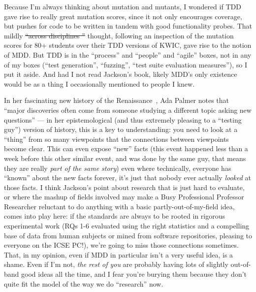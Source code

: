 \documentclass[sigplan,screen]{acmart}
\providecommand{\DIFadd}[1]{{\protect\color{blue}\uwave{#1}}} %
\providecommand{\DIFdel}[1]{{\protect\color{red}\sout{#1}}}                      %
\providecommand{\DIFaddbegin}{} %
\providecommand{\DIFaddend}{} %
\providecommand{\DIFdelbegin}{} %
\providecommand{\DIFdelend}{} %
\newcommand{\DIFscaledelfig}{0.5}
\newlength{\DIFdelgraphicswidth} %
\newlength{\DIFdelgraphicsheight} %
\newcommand{\DIFaddincludegraphics}[2][]{{\color{blue}\fbox{\DIFOincludegraphics[#1]{#2}}}} %
\newcommand{\DIFdelincludegraphics}[2][]{%
\sbox{\DIFdelgraphicsbox}{\DIFOincludegraphics[#1]{#2}}%
\settoboxwidth{\DIFdelgraphicswidth}{\DIFdelgraphicsbox} %
\settoboxtotalheight{\DIFdelgraphicsheight}{\DIFdelgraphicsbox} %
\scalebox{\DIFscaledelfig}{%
\parbox[b]{\DIFdelgraphicswidth}{\usebox{\DIFdelgraphicsbox}\\[-\baselineskip] \rule{\DIFdelgraphicswidth}{0em}}\llap{\resizebox{\DIFdelgraphicswidth}{\DIFdelgraphicsheight}{%
\setlength{\unitlength}{\DIFdelgraphicswidth}%
\begin{picture}(1,1)%
\thicklines\linethickness{2pt} %
{\color[rgb]{1,0,0}\put(0,0){\framebox(1,1){}}}%
{\color[rgb]{1,0,0}\put(0,0){\line( 1,1){1}}}%
{\color[rgb]{1,0,0}\put(0,1){\line(1,-1){1}}}%
\end{picture}%
}\hspace*{3pt}}} %
} %
\DeclareRobustCommand{\DIFaddbegin}{\DIFOaddbegin \let\includegraphics\DIFaddincludegraphics} %
\DeclareRobustCommand{\DIFaddend}{\DIFOaddend \let\includegraphics\DIFOincludegraphics} %
\DeclareRobustCommand{\DIFdelbegin}{\DIFOdelbegin \let\includegraphics\DIFdelincludegraphics} %
\DeclareRobustCommand{\DIFdelend}{\DIFOaddend \let\includegraphics\DIFOincludegraphics} %
\begin{document}
Because I'm always thinking about mutation and mutants, I wondered if
TDD gave rise to really great mutation scores, since it not only
encourages coverage, but pushes for code to be written in tandem with
good functionality probes.  That mildly \DIFdelbegin \DIFdel{``across disciplines
''
}\DIFdelend \DIFaddbegin \DIFadd{across disciplines
}\DIFaddend thought, following an inspection of the mutation scores for 80+
students over their TDD versions of KWIC,
gave rise to the notion of MDD.  But TDD is in the ``process'' and
``people'' and ``agile'' boxes, not in any of my boxes (``test
generation'', ``fuzzing'', ``test suite evaluation measures''), so I
put it aside.  And had I not read Jackson's book, likely MDD's only
existence would be as a thing I occasionally mentioned to people I knew.

In her fascinating new history of the Renaissance~\cite{palmer}, Ada
Palmer notes that ``major discoveries often come from someone studying
a different topic asking new questions'' --- in her epistemological
(and thus extremely pleasing to a ``testing guy'') version of history,
this is a key to understanding:  you need to look at a ``thing'' from so many
viewpoints that the connections between viewpoints become clear.  This
can even expose ``new''
facts (this event happened less than a week before
this other similar event, and was done by the same guy, that means
they are really \emph{part of the same story}) even where technically,
everyone has ``known'' about the new facts forever, it's just that
nobody ever actually \emph{looked} at those facts.  I think Jackson's
point about research that is just hard to evaluate, or where the mashup of fields
involved may make a Busy Professional Professor Researcher reluctant
to do anything with a basic partly-out-of-my-field idea, comes into play here:  if the standards are
always to be rooted in rigorous experimental work (RQs 1-6 evaluated
using the right statistics and a compelling base of data from human
subjects or mined from software repositories, pleasing to everyone on
the ICSE PC!), we're going to miss those connections sometimes.
That, in my opinion, even if MDD in particular isn't a very useful
idea, is a shame.  Even if I'm not, \emph{the rest of you} are probably having lots of
slightly out-of-band good ideas all the time, and I fear you're
burying them because they don't quite fit the model of the way we do
``research'' now.



\end{document}
